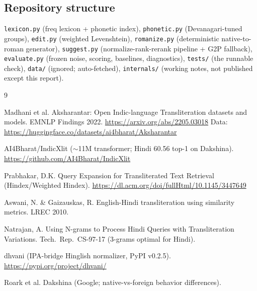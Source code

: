 \documentclass[11pt,a4paper]{article}
\begin{document}
\subsection{Repository structure}

\verb!lexicon.py! (freq lexicon + phonetic index), \verb!phonetic.py! (Devanagari-tuned groups), \verb!edit.py! (weighted Levenshtein), \verb!romanize.py! (deterministic native-to-roman generator), \verb!suggest.py! (normalize-rank-rerank pipeline + G2P fallback), \verb!evaluate.py! (frozen noise, scoring, baselines, diagnostics), \verb!tests/! (the runnable check), \verb!data/! (ignored; auto-fetched), \verb!internals/! (working notes, not published except this report).

\begin{thebibliography}{9}

 Madhani et al. Aksharantar: Open Indic-language Transliteration datasets and models. EMNLP Findings 2022. \url{https://arxiv.org/abs/2205.03018} Data: \url{https://huggingface.co/datasets/ai4bharat/Aksharantar}

 AI4Bharat/IndicXlit ($\sim$11M transformer; Hindi 60.56 top-1 on Dakshina). \url{https://github.com/AI4Bharat/IndicXlit}

 Prabhakar, D.K. Query Expansion for Transliterated Text Retrieval (Hindex/Weighted Hindex). \url{https://dl.acm.org/doi/fullHtml/10.1145/3447649}

 Aswani, N. \& Gaizauskas, R. English-Hindi transliteration using similarity metrics. LREC 2010.

 Natrajan, A. Using N-grams to Process Hindi Queries with Transliteration Variations. Tech.\ Rep.\ CS-97-17 (3-grams optimal for Hindi).

 dhvani (IPA-bridge Hinglish normalizer, PyPI v0.2.5). \url{https://pypi.org/project/dhvani/}

 Roark et al. Dakshina (Google; native-vs-foreign behavior differences).

\end{thebibliography}
\end{document}
